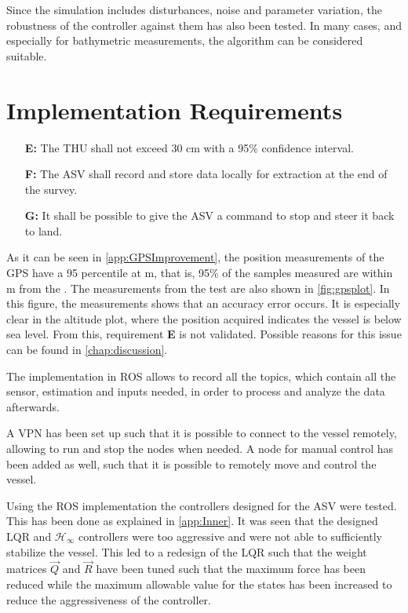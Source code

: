 Since the simulation includes disturbances, noise and parameter variation, the robustness of the controller against them has also been tested. In many cases, and especially for bathymetric measurements, the algorithm can be considered suitable.


\section{Implementation Requirements}
\begin{itemize}
  \item[\textbf{E:}] The THU shall not exceed 30 cm with a 95\% confidence interval.
  \item[\textbf{F:}] The ASV shall record and store data locally for extraction at the end of the survey.
  \item[\textbf{G:}] It shall be possible to give the ASV a command to stop and steer it back to land.
\end{itemize}

As it can be seen in \autoref{app:GPSImprovement}, the position measurements of the GPS have a 95 percentile at  m, that is, 95\% of the samples measured are within  m from the . The measurements from the test are also shown in \autoref{fig:gpsplot}. In this figure, the measurements shows that an accuracy error occurs. It is especially clear in the altitude plot, where the position acquired indicates the vessel is below sea level. From this, requirement \textbf{E} is not validated. Possible reasons for this issue can be found in \autoref{chap:discussion}. 


The implementation in ROS allows to record all the topics, which contain all the sensor, estimation and inputs needed, in order to process and analyze the data afterwards.

A VPN has been set up such that it is possible to connect to the vessel remotely, allowing to run and stop the nodes when needed. A node for manual control has been added as well, such that it is possible to remotely move and control the vessel.

Using the ROS implementation the controllers designed for the ASV were tested. This has been done as explained in \autoref{app:Inner}. It was seen that the designed LQR and $\mathcal{H}_\infty$ controllers were too aggressive and were not able to sufficiently stabilize the vessel. This led to a redesign of the LQR such that the weight matrices $\vec{Q}$ and $\vec{R}$ have been tuned such that the maximum force has been reduced while the maximum allowable value for the states has been increased to reduce the aggressiveness of the controller.
  
